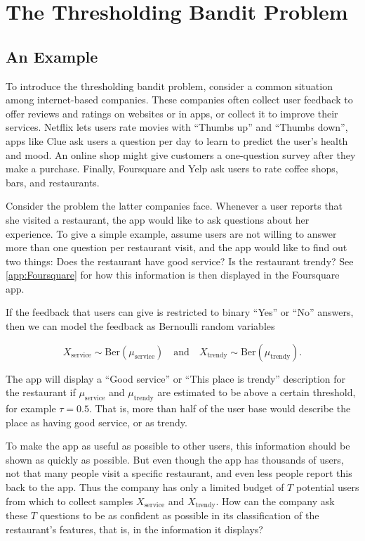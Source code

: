 \documentclass[11pt,]{article}
\begin{document}
\newpage

\section{\texorpdfstring{The Thresholding Bandit Problem
\label{chap:ThresholdingBanditProblem}}{The Thresholding Bandit Problem }}\label{the-thresholding-bandit-problem}

\subsection{An Example}\label{an-example}

To introduce the thresholding bandit problem, consider a common
situation among internet-based companies. These companies often collect
user feedback to offer reviews and ratings on websites or in apps, or
collect it to improve their services. Netflix lets users rate movies
with ``Thumbs up'' and ``Thumbs down'', apps like Clue ask users a
question per day to learn to predict the user's health and mood. An
online shop might give customers a one-question survey after they make a
purchase. Finally, Foursquare and Yelp ask users to rate coffee shops,
bars, and restaurants.

Consider the problem the latter companies face. Whenever a user reports
that she visited a restaurant, the app would like to ask questions about
her experience. To give a simple example, assume users are not willing
to answer more than one question per restaurant visit, and the app would
like to find out two things: Does the restaurant have good service? Is
the restaurant trendy? See \autoref{app:Foursquare} for how this
information is then displayed in the Foursquare app.

If the feedback that users can give is restricted to binary ``Yes'' or
``No'' answers, then we can model the feedback as Bernoulli random
variables

\[
X_{\text{service}} \sim \text{Ber}(\mu_{\text{service}}) \quad \text{and} \quad X_{\text{trendy}} \sim \text{Ber}(\mu_{\text{trendy}}).
\]

The app will display a ``Good service'' or ``This place is trendy''
description for the restaurant if \(\mu_{\text{service}}\) and
\(\mu_{\text{trendy}}\) are estimated to be above a certain threshold,
for example \(\tau = 0.5\). That is, more than half of the user base
would describe the place as having good service, or as trendy.

To make the app as useful as possible to other users, this information
should be shown as quickly as possible. But even though the app has
thousands of users, not that many people visit a specific restaurant,
and even less people report this back to the app. Thus the company has
only a limited budget of \(T\) potential users from which to collect
samples \(X_{\text{service}}\) and \(X_{\text{trendy}}\). How can the
company ask these \(T\) questions to be as confident as possible in its
classification of the restaurant's features, that is, in the information
it displays?
\end{document}

